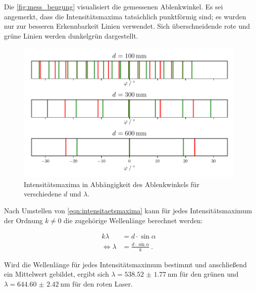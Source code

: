 Die \autoref{fig:mess_beugung} visualisiert die gemessenen Ablenkwinkel.
Es sei angemerkt,
dass die Intensitätsmaxima tatsächlich punktförmig sind;
es wurden nur zur besseren Erkennbarkeit Linien verwendet.
Sich überschneidende rote und grüne Linien werden dunkelgrün dargestellt.

\begin{figure}
    \centering
    \includegraphics[width=\textwidth]{build/plt/beugung.pdf}
    \caption{Intensitätsmaxima in Abhängigkeit des Ablenkwinkels für verschiedene $d$ und $\lambda$.}
    \label{fig:mess_beugung}
\end{figure}

Nach Umstellen von \eqref{eqn:intensitaetsmaxima} kann
für jedes Intensitätsmaximum der Ordnung $k \neq 0$
die zugehörige Wellenlänge berechnet werden:

\begin{align*}
  k \lambda &= d \cdot \sin\alpha \\
  \Leftrightarrow
  \lambda &= \frac{d \cdot \sin\alpha}{k}  \ .
\end{align*}

Wird die Wellenlänge für jedes Intensitätsmaximum bestimmt
und anschließend ein Mittelwert gebildet,
ergibt sich
$\lambda = \SI{538.52(177)}{\nano\meter}$ für den grünen und
$\lambda = \SI{644.60(242)}{\nano\meter}$ für den roten Laser.
